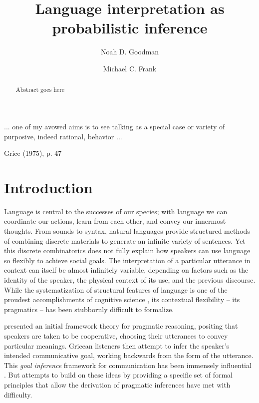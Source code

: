 \documentclass[]{elsarticle}
\title{Language interpretation as probabilistic inference}
\author[stan]{Noah D. Goodman\corref{cor1}}
\author[stan]{Michael C. Frank}
\begin{document}
  \begin{abstract}
  Abstract goes here
  \end{abstract}

\maketitle

\epigraph{... one of my avowed aims is to see talking as a special case or
variety of purposive, indeed rational, behavior ...}{Grice (1975),
p. 47}

\section{Introduction}\label{introduction}

Language is central to the successes of our species; with language we
can coordinate our actions, learn from each other, and convey our
innermost thoughts. From sounds to syntax, natural languages provide
structured methods of combining discrete materials to generate an
infinite variety of sentences. Yet this discrete combinatorics does not
fully explain how speakers can use language so flexibly to achieve
social goals. The interpretation of a particular utterance in context
can itself be almost infinitely variable, depending on factors such as
the identity of the speaker, the physical context of its use, and the
previous discourse. While the systematization of structural features of
language is one of the proudest accomplishments of cognitive science \citep[e.g.,][]{chomsky1965,jackendoff2002,goldberg2003}, its contextual
flexibility -- its pragmatics -- has been stubbornly difficult to
formalize.

\citet{grice1975} presented an initial framework theory for pragmatic
reasoning, positing that speakers are taken to be cooperative, choosing
their utterances to convey particular meanings. Gricean listeners then
attempt to infer the speaker's intended communicative goal, working
backwards from the form of the utterance. This \emph{goal inference}
framework for communication has been immensely influential \cite[e.g.,][]{horn1984,sperber1986,clark1996,levinson2000}. But
attempts to build on these ideas by providing a specific set of formal
principles that allow the derivation of pragmatic inferences have met
with difficulty.
\end{document}
